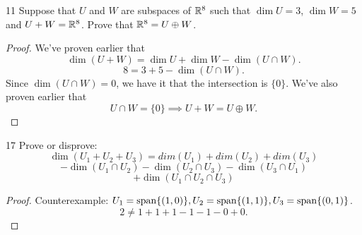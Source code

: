 \documentclass[12pt, letterpaper]{article}
\begin{document}
\begin{problem}
{11}
Suppose that $U$ and $W$ are subspaces of $\mathbb{R}^8$ 
such that $\dim U=3$, $\dim W=5$ and $U+W=\mathbb{R}^8$.
Prove that $\mathbb{R}^8=U\oplus W$.
\end{problem}
\begin{proof}
We've proven earlier that 
$$\dim(U+W)=\dim U+\dim W-\dim(U\cap W).$$
$$8=3+5-\dim(U\cap W).$$
Since $\dim(U\cap W)=0$, we have it that the intersection is $\{0\}$.
We've also proven earlier that 
$$U\cap W=\{0\}\implies U+W=U\oplus W.$$
\end{proof}

\begin{problem}
{17}
Prove or disprove:
$$\dim(U_1+U_2+U_3) = dim(U_1)+dim(U_2)+dim(U_3)$$
$$-\dim(U_1\cap U_2)-\dim(U_2\cap U_3)-\dim(U_3\cap U_1)$$
$$+\dim(U_1\cap U_2\cap U_3)$$
\end{problem}
\begin{proof}
Counterexample:
$U_1=\operatorname{span}\{(1,0)\},U_2=\operatorname{span}\{(1,1)\},U_3=\operatorname{span}\{(0,1)\}$.
$$2\neq1+1+1-1-1-0+0.$$
\end{proof}
\end{document}
